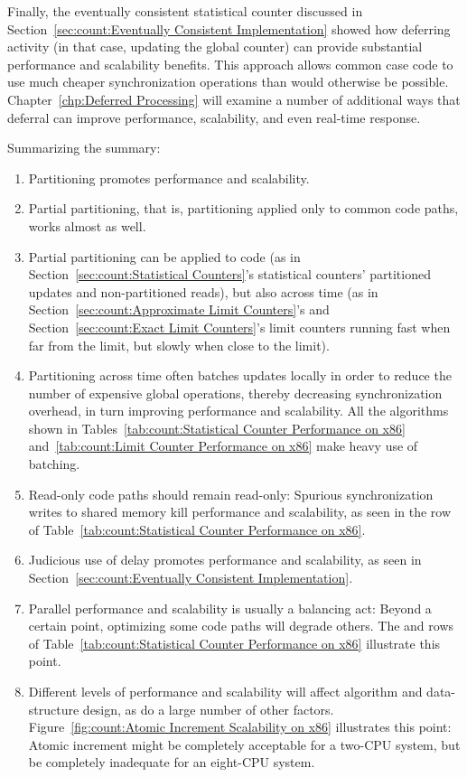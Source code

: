 Finally, the eventually consistent statistical counter discussed in
Section~\ref{sec:count:Eventually Consistent Implementation}
showed how deferring activity (in that case, updating the global
counter) can provide substantial performance and scalability benefits.
This approach allows common case code to use much cheaper synchronization
operations than would otherwise be possible.
Chapter~\ref{chp:Deferred Processing} will examine a number of additional
ways that deferral can improve performance, scalability, and even
real-time response.

Summarizing the summary:

\begin{enumerate}
\item	Partitioning promotes performance and scalability.
\item	Partial partitioning, that is, partitioning applied only to
	common code paths, works almost as well.
\item	Partial partitioning can be applied to code (as in
	Section~\ref{sec:count:Statistical Counters}'s statistical
	counters' partitioned updates and non-partitioned reads), but also
	across time (as in
	Section~\ref{sec:count:Approximate Limit Counters}'s and
	Section~\ref{sec:count:Exact Limit Counters}'s
	limit counters running fast when far from
	the limit, but slowly when close to the limit).
\item	Partitioning across time often batches updates locally
	in order to reduce the number of expensive global operations,
	thereby decreasing synchronization overhead, in turn
	improving performance and scalability.
	All the algorithms shown in
	Tables~\ref{tab:count:Statistical Counter Performance on x86}
	and~\ref{tab:count:Limit Counter Performance on x86}
	make heavy use of batching.
\item	Read-only code paths should remain read-only:  Spurious
	synchronization writes to shared memory kill performance
	and scalability, as seen in the  row of
	Table~\ref{tab:count:Statistical Counter Performance on x86}.
\item	Judicious use of delay promotes performance and scalability, as
	seen in Section~\ref{sec:count:Eventually Consistent Implementation}.
\item	Parallel performance and scalability is usually a balancing act:
	Beyond a certain point, optimizing some code paths will degrade
	others.
	The  and  rows of
	Table~\ref{tab:count:Statistical Counter Performance on x86}
	illustrate this point.
\item	Different levels of performance and scalability will affect
	algorithm and data-structure design, as do a large number of
	other factors.
	Figure~\ref{fig:count:Atomic Increment Scalability on x86}
	illustrates this point:  Atomic increment might be completely
	acceptable for a two-CPU system, but be completely inadequate for an
	eight-CPU system.
\end{enumerate}

